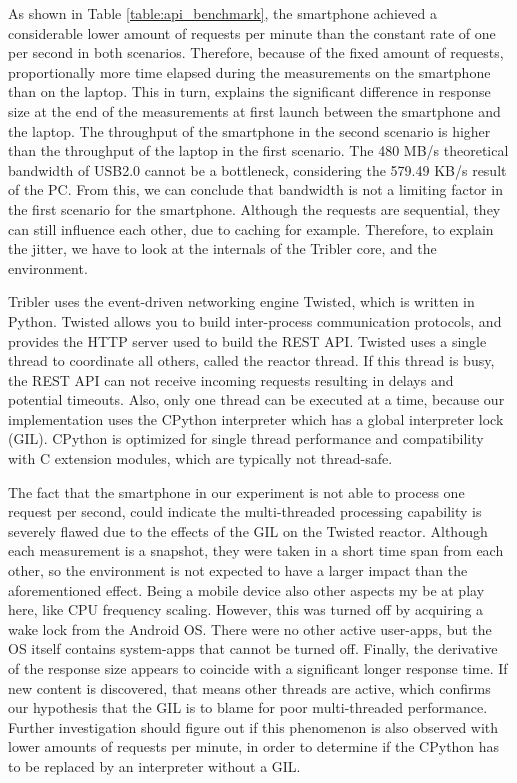 As shown in Table \ref{table:api_benchmark}, the smartphone achieved a considerable lower amount of requests per minute than the constant rate of one per second in both scenarios.
Therefore, because of the fixed amount of requests, proportionally more time elapsed during the measurements on the smartphone than on the laptop.
This in turn, explains the significant difference in response size at the end of the measurements at first launch between the smartphone and the laptop.
The throughput of the smartphone in the second scenario is higher than the throughput of the laptop in the first scenario.
The 480 MB/s theoretical bandwidth of USB2.0 cannot be a bottleneck, considering the 579.49 KB/s result of the PC.
From this, we can conclude that bandwidth is not a limiting factor in the first scenario for the smartphone.
Although the requests are sequential, they can still influence each other, due to caching for example.
Therefore, to explain the jitter, we have to look at the internals of the Tribler core, and the environment.

Tribler uses the event-driven networking engine Twisted, which is written in Python.
Twisted allows you to build inter-process communication protocols, and provides the HTTP server used to build the REST API.
Twisted uses a single thread to coordinate all others, called the reactor thread.
If this thread is busy, the REST API can not receive incoming requests resulting in delays and potential timeouts.
Also, only one thread can be executed at a time, because our implementation uses the CPython interpreter which has a global interpreter lock (GIL).
CPython is optimized for single thread performance and compatibility with C extension modules, which are typically not thread-safe.

The fact that the smartphone in our experiment is not able to process one request per second, could indicate the multi-threaded processing capability is severely flawed due to the effects of the GIL on the Twisted reactor.
Although each measurement is a snapshot, they were taken in a short time span from each other, so the environment is not expected to have a larger impact than the aforementioned effect.
Being a mobile device also other aspects my be at play here, like CPU frequency scaling.
However, this was turned off by acquiring a wake lock from the Android OS.
There were no other active user-apps, but the OS itself contains system-apps that cannot be turned off.
Finally, the derivative of the response size appears to coincide with a significant longer response time.
If new content is discovered, that means other threads are active, which confirms our hypothesis that the GIL is to blame for poor multi-threaded performance.
Further investigation should figure out if this phenomenon is also observed with lower amounts of requests per minute, in order to determine if the CPython has to be replaced by an interpreter without a GIL.


